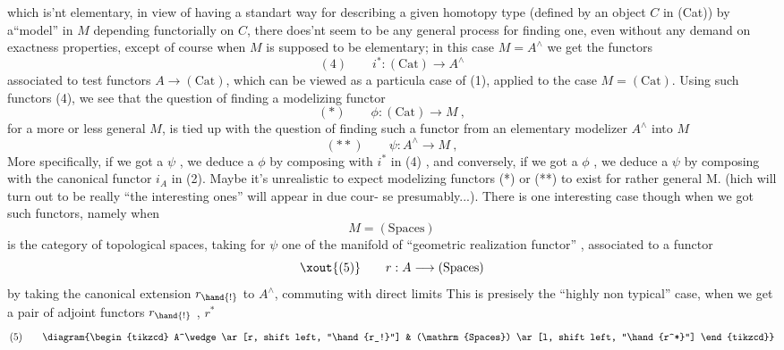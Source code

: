 which is'nt elementary,  in view of having a standart way for describing
a given homotopy type (defined by an object $C$ in (Cat)) by a``model'' in $M$
depending functorially on $C$,  there does'nt seem to be any general process
for finding one,  even without any demand on exactness properties,  except
of course when $M$ is supposed to be elementary;   in this case  $M = A^\wedge$
we get  the functors
\[ (4) \qquad i^* : (\mathrm{Cat}) \longrightarrow A^\wedge \]
associated to test functors $A \to (\mathrm{Cat})$,  which can be viewed as a particula
case of (1),  applied to the case $M = (\mathrm{Cat})$.  Using  such functors
(4),  we see that the question of finding a modelizing functor
\[ (*) \qquad \phi : (\mathrm{Cat}) \longrightarrow M \ , \]
for a more or less general $M$,  is tied up with the question of finding
such a functor from an elementary modelizer $A^\wedge$ into $M$
\[ (**) \qquad \psi : A^\wedge \longrightarrow M \ , \]
More specifically,  if we got a $\psi$ ,  we deduce a $\phi$ by composing with
$i^*$ in (4) ,  and conversely,  if we got a $\phi$ ,  we deduce a $\psi$ by composing
with the canonical functor $i_A$ in (2).  Maybe it's unrealistic to expect
modelizing functors (*) or (**) to exist for rather general M. (hich 
will turn out to be really ``the interesting ones'' will appear in due cour-%
se presumably...).  There is  one interesting case though when we got such
functors,  namely when
\[ M = (\mathrm{Spaces}) \]
is the category of topological spaces,  taking for $\psi$ one of the manifold
  of ``geometric realization functor'' ,  associated to a  functor
\[ \xout{(5)} \qquad r : A \longrightarrow (\mathrm{Spaces}) \]
by taking the canonical extension $r_{\hand{!}}$ to $A^\wedge$,  commuting with direct limits
This is presisely the  ``highly non typical'' case,  when we get a
pair of adjoint functors  $r_{\hand{!}}$ , $r^*$
\[ (5) \qquad \diagram{\begin{tikzcd} A^\wedge \ar[r, shift left, "\hand{r_!}"] & (\mathrm{Spaces}) \ar[l, shift left, "\hand{r^*}"] \end{tikzcd}} \]
